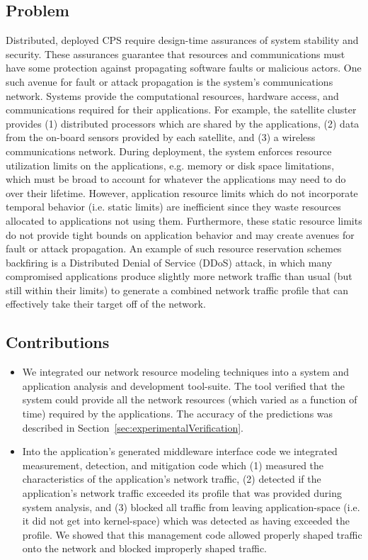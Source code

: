 \subsection{Problem}
Distributed, deployed CPS require design-time assurances of system
stability and security.  These assurances guarantee that resources and
communications must have some protection against propagating software
faults or malicious actors.  One such avenue for fault or attack
propagation is the system's communications network.  Systems provide
the computational resources, hardware access, and communications
required for their applications.  For example, the satellite cluster
provides (1) distributed processors which are shared by the
applications, (2) data from the on-board sensors provided by each
satellite, and (3) a wireless communications network.  During
deployment, the system enforces resource utilization limits on the
applications, e.g. memory or disk space limitations, which must be
broad to account for whatever the applications may need to do over
their lifetime.  However, application resource limits which do not
incorporate temporal behavior (i.e. static limits) are inefficient
since they waste resources allocated to applications not using them.
Furthermore, these static resource limits do not provide tight bounds
on application behavior and may create avenues for fault or attack
propagation.  An example of such resource reservation schemes
backfiring is a Distributed Denial of Service (DDoS) attack, in which
many compromised applications produce slightly more network traffic
than usual (but still within their limits) to generate a combined
network traffic profile that can effectively take their target off of
the network.

\subsection{Contributions}
\begin{itemize}
	\item We integrated our network resource modeling techniques
          into a system and application analysis and development
          tool-suite. The tool verified that the system could provide
          all the network resources (which varied as a function of
          time) required by the applications.  The accuracy of the
          predictions was described in
          Section~\ref{sec:experimentalVerification}.
	\item Into the application's generated middleware interface
          code we integrated measurement, detection, and mitigation
          code which (1) measured the characteristics of the
          application's network traffic, (2) detected if the
          application's network traffic exceeded its profile that was
          provided during system analysis, and (3) blocked all traffic
          from leaving application-space (i.e. it did not get into
          kernel-space) which was detected as having exceeded the
          profile.  We showed that this management code allowed
          properly shaped traffic onto the network and blocked
          improperly shaped traffic.
\end{itemize}

